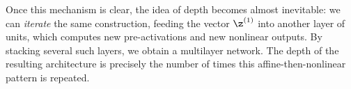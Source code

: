 \begin{center}
\end{center}

\medskip
Once this mechanism is clear, the idea of depth becomes almost inevitable: we can \emph{iterate} the same construction, feeding the vector $\z^{(1)}$ into another layer of units, which computes new pre-activations and new nonlinear outputs. By stacking several such layers, we obtain a multilayer network. The depth of the resulting architecture is precisely the number of times this affine-then-nonlinear pattern is repeated.

